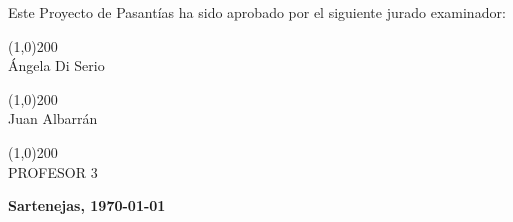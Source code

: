 \begin{titlepage}
\begin{center}
\begin{minipage}{\textwidth}
            \bigskip
            \bigskip
            \bigskip
            \bigskip
            
            Este Proyecto de Pasantías ha sido aprobado por el siguiente jurado examinador: \\
            
            \bigskip
            \bigskip
            
            \line(1,0){200} \\
            Ángela Di Serio\\
            
            \bigskip
            \bigskip
            
            \line(1,0){200} \\
            Juan Albarrán\\
            
            \bigskip
            \bigskip
            
            \line(1,0){200} \\
            PROFESOR 3 \\
        \end{minipage}
        
        \bigskip
        \bigskip
        \vfill
        
        {\large \bfseries Sartenejas, \today}
        
    \end{center}
\end{titlepage}

\pagebreak
